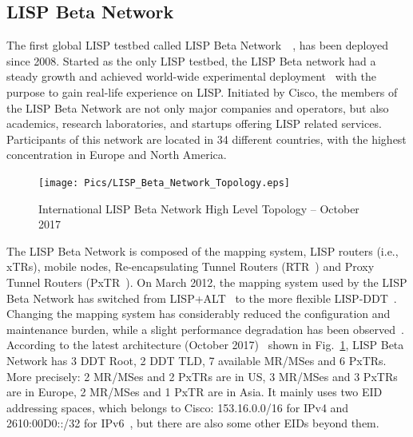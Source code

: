 \subsection{LISP Beta Network}
\label{subsec:platform_beta}

The first global LISP testbed called LISP Beta Network~\cite{lispbeta}~\cite{coras2014performance}, has been deployed since 2008. Started as the only LISP testbed, the LISP Beta network had a steady growth and achieved world-wide experimental deployment~\cite{lispCCR} with the purpose to gain real-life experience on LISP. Initiated by Cisco, the members of the LISP Beta Network are not only major companies and operators, but also academics, research laboratories, and startups offering LISP related services. Participants of this network are located in 34 different countries, with the highest concentration in Europe and North America.

\begin{figure}[!t]
	\centering
	\texttt{[image: Pics/LISP\_Beta\_Network\_Topology.eps]}
	\caption{International LISP Beta Network High Level Topology – October 2017~\cite{lispbetaarchi}}
	\label{LISP_Beta_Network_Topology}
\end{figure}
The LISP Beta Network is composed of the mapping system, LISP routers (i.e., xTRs), mobile nodes, Re-encapsulating Tunnel Routers (RTR~\cite{ermagan2016nat}) and Proxy Tunnel Routers (PxTR~\cite{rfc6832}). On March  2012, the mapping system used by the LISP Beta Network has switched from LISP+ALT~\cite{rfc6836} to the more flexible LISP-DDT~\cite{lispDDT}. Changing the  mapping system has considerably reduced the configuration and maintenance burden, while a slight performance degradation has been observed~\cite{lispCCR}. According to the latest architecture (October 2017)~\cite{lispbetaarchi} shown in Fig.~\ref{LISP_Beta_Network_Topology}, LISP Beta Network has 3 DDT Root, 2 DDT TLD, 7 available MR/MSes and 6 PxTRs. More precisely: 2 MR/MSes and 2 PxTRs are in US, 3 MR/MSes and 3 PxTRs are in Europe, 2 MR/MSes and 1 PxTR are in Asia. It mainly uses two EID addressing spaces, which belongs to Cisco: 153.16.0.0/16 for IPv4 and 2610:00D0::/32 for IPv6~\cite{lispCCR}, but there are also some other EIDs beyond them. %


